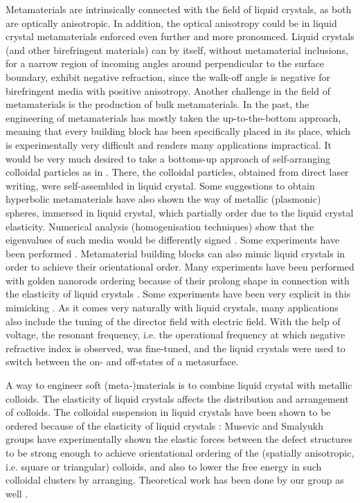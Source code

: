 \documentclass[a4paper,11pt]{article}
\begin{document}
Metamaterials are intrinsically connected with the field of liquid crystals, as both are optically anisotropic. 
In addition, the optical anisotropy could be in liquid crystal metamaterials enforced even further and more pronounced. 
Liquid crystals (and other birefringent materials) can by itself, without metamaterial inclusions, for a narrow region of incoming angles around perpendicular to the surface boundary, exhibit negative refraction, since the walk-off angle is negative for birefringent media with positive anisotropy. 
Another challenge in the field of metamaterials is the production of bulk metamaterials. 
In the past, the engineering of metamaterials has mostly taken the up-to-the-bottom approach, meaning that every building block has been specifically placed in its place, which is experimentally very difficult and renders many applications impractical. 
It would be very much desired to take a bottoms-up approach of self-arranging colloidal particles as in \cite{tartan}. 
There, the colloidal particles, obtained from direct laser writing, were self-assembled in liquid crystal. 
Some suggestions to obtain hyperbolic metamaterials have also shown the way of metallic (plasmonic) spheres, immersed in liquid crystal, which partially order due to the liquid crystal elasticity. 
Numerical analysis (homogenisation techniques) show that the eigenvalues of such media would be differently signed \cite{khoo}. 
Some experiments have been performed \cite{ponsinet-virginie?}. 
Metamaterial building blocks can also mimic liquid crystals in order to achieve their orientational order. 
Many experiments have been performed with golden nanorods ordering because of their prolong shape in connection with the elasticity of liquid crystals \cite{nanoparticles}. 
Some experiments have been very explicit in this mimicking \cite{shadrivov}. 
As it comes very naturally with liquid crystals, many applications also include the tuning of the director field with electric field. 
With the help of voltage, the resonant frequency, i.e. the operational frequency at which negative refractive index is observed, was fine-tuned, and the liquid crystals were used to switch between the on- and off-states of a metasurface. 

A way to engineer soft (meta-)materials is to combine liquid crystal with metallic colloids. 
The elasticity of liquid crystals affects the distribution and arrangement of colloids. 
The colloidal suspension in liquid crystals have been shown to be ordered because of the elasticity of liquid crystals \cite{1, 2, 3,}: 
Musevic and Smalyukh groups have experimentally shown the elastic forces between the defect structures to be strong enough to achieve orientational ordering of the (spatially anisotropic, i.e. square or triangular) colloids, and also to lower the free energy in such colloidal clusters by arranging. 
Theoretical work has been done by our group as well \cite{cc}. 
\end{document}
